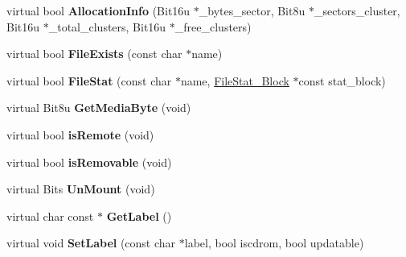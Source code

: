 \begin{DoxyCompactItemize}
\item 
\hypertarget{classlocalDrive_abc95b6539cb6e9e1d59362af64fc0426}{virtual bool {\bfseries Allocation\-Info} (Bit16u $\ast$\-\_\-bytes\-\_\-sector, Bit8u $\ast$\-\_\-sectors\-\_\-cluster, Bit16u $\ast$\-\_\-total\-\_\-clusters, Bit16u $\ast$\-\_\-free\-\_\-clusters)}\label{classlocalDrive_abc95b6539cb6e9e1d59362af64fc0426}

\item 
\hypertarget{classlocalDrive_a0ef1536b3b43bdc29c1aa8054109e9bf}{virtual bool {\bfseries File\-Exists} (const char $\ast$name)}\label{classlocalDrive_a0ef1536b3b43bdc29c1aa8054109e9bf}

\item 
\hypertarget{classlocalDrive_a3345badc73c852a8265093936960b16d}{virtual bool {\bfseries File\-Stat} (const char $\ast$name, \hyperlink{structFileStat__Block}{File\-Stat\-\_\-\-Block} $\ast$const stat\-\_\-block)}\label{classlocalDrive_a3345badc73c852a8265093936960b16d}

\item 
\hypertarget{classlocalDrive_abe537418d01f04b3f3568a13d8a2c792}{virtual Bit8u {\bfseries Get\-Media\-Byte} (void)}\label{classlocalDrive_abe537418d01f04b3f3568a13d8a2c792}

\item 
\hypertarget{classlocalDrive_aaa7ae4a2b1c824634b8fb4dc4beea186}{virtual bool {\bfseries is\-Remote} (void)}\label{classlocalDrive_aaa7ae4a2b1c824634b8fb4dc4beea186}

\item 
\hypertarget{classlocalDrive_acf4bb430328064549e1ae307c7d9da5f}{virtual bool {\bfseries is\-Removable} (void)}\label{classlocalDrive_acf4bb430328064549e1ae307c7d9da5f}

\item 
\hypertarget{classlocalDrive_a78fa4db10eac30c4bbb012a91bae2358}{virtual Bits {\bfseries Un\-Mount} (void)}\label{classlocalDrive_a78fa4db10eac30c4bbb012a91bae2358}

\item 
\hypertarget{classlocalDrive_a77e69f2aabe420f7d47afbd6d882727d}{virtual char const $\ast$ {\bfseries Get\-Label} ()}\label{classlocalDrive_a77e69f2aabe420f7d47afbd6d882727d}

\item 
\hypertarget{classlocalDrive_a1a133bdf134c07e73ae69798a6dc286a}{virtual void {\bfseries Set\-Label} (const char $\ast$label, bool iscdrom, bool updatable)}\label{classlocalDrive_a1a133bdf134c07e73ae69798a6dc286a}


\end{DoxyCompactItemize}
